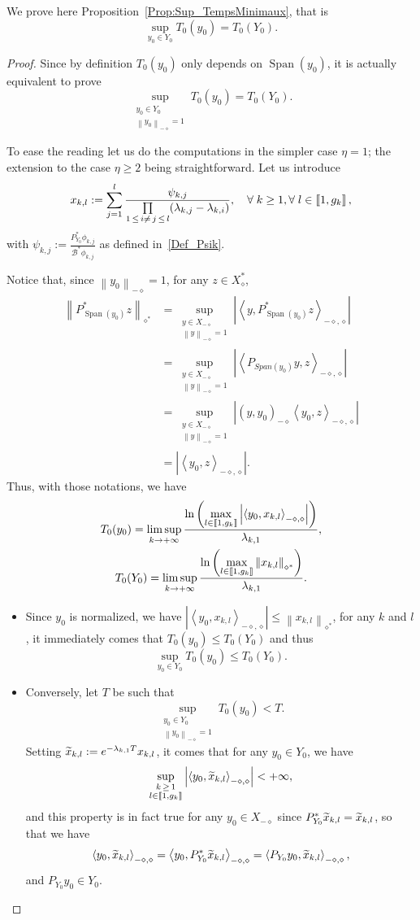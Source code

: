 \documentclass[10pt]{amsart}
\theoremstyle{definition}\newtheorem{defi}[theo]{Definition}\newtheorem{rema}[theo]{Remark}\newtheorem{exam}[theo]{Example}\newtheorem{exem}[theo]{Example}\newtheorem{nota}[theo]{Notation}
\newcommand{\llbracket}{\mathopen{[\mkern -2.7mu[}}
\newcommand{\rrbracket}{\mathclose{]\mkern -2.7mu]}}
\newcommand{\inter}[2]{\llbracket #1,#2 \rrbracket}
\newcommand\Bs{\mathcal{B}^*}
\newcommand{\Xalphas}{X_\diamond^*}
\newcommand{\Xmalpha}{X_{-\diamond}}
\newcommand{\Fzp}{Y_0}
\newcommand{\normeXalphas}[1]{\left\| #1 \right\|_{\diamond^*}}
\newcommand{\normeXmalpha}[1]{\left\| #1 \right\|_{-\diamond}}
\newcommand{\psXmalpha}[2]{\left(#1, #2 \right)_{-\diamond}}
\newcommand{\dual}[2]{\left\langle #1, #2 \right\rangle_{-\diamond,\diamond}}
\newcommand{\PF}{P_{\Fzp}}
\newcommand{\PFa}{P_{\Fzp}^*}
\newcommand{\n}{g}
\DeclareMathOperator{\Span}{Span}
\let\oldtilde\tilde
\renewcommand*{\tilde}[1]{\mathchoice{\widetilde{#1}}{\widetilde{#1}}{\oldtilde{#1}}{\oldtilde{#1}}}\let\oldexists\exists
\renewcommand*{\exists}{\mathrel{\oldexists}}
\let\oldforall\forall
\renewcommand*{\forall}{\mathrel{\oldforall}}
\begin{document}
We prove here Proposition~\ref{Prop:Sup_TempsMinimaux}, that is
\[
\sup_{y_0\in \Fzp} T_{0}(y_0) = T_{0}(\Fzp).
\]
\begin{proof}
Since by definition $T_0(y_0)$ only depends on $\Span(y_0)$, it is actually equivalent to prove
\[
\sup_{\substack{y_0\in \Fzp \\ \normeXmalpha{y_0}=1}} T_{0}(y_0) = T_{0}(\Fzp).
\]

To ease the reading let us do the computations in the simpler case $\eta=1$; the extension to the case $\eta \geq 2$ being straightforward. Let us introduce
\[
x_{k,l} := \sum\limits_{j=1}^l \frac{\psi_{k,j} }{\prod\limits_{1\,\leq\,i \neq\,j\,\leq\,l} (\lambda_{k,j}-\lambda_{k,i})},\quad \forall k\geq 1, \forall l\in \inter{1}{\n_k}\,,
\]
with $\psi_{k,j} := \frac{\PFa \phi_{k,j}}{\Bs \phi_{k,j}}$ as defined in~\eqref{Def_Psik}.



Notice that, since $\normeXmalpha{y_0} =1$, for any $z \in \Xalphas$,
\begin{align*}
\normeXalphas{ P_{\Span(y_0)}^* z } &= \sup\limits_{ \substack{ y \in \Xmalpha \\ \normeXmalpha{y}=1 } } \left| \dual{y}{P_{\Span(y_0)}^*z} \right|
\\
&= \sup\limits_{ \substack{ y \in \Xmalpha \\ \normeXmalpha{y}=1 } } \left| \dual{P_{Span(y_0)}y}{z} \right|
\\
&= \sup\limits_{ \substack{ y \in \Xmalpha \\ \normeXmalpha{y}=1 } } \left| \psXmalpha{y}{y_0} \dual{y_0}{z} \right|
\\
&= \left| \dual{y_0}{z} \right|.
\end{align*}
Thus, with those notations, we have
\begin{gather*}
T_0(y_0) = \limsup_{k\to+\infty} \frac{\ln \left(\max\limits_{l\in \inter{1}{\n_k}} \left| \dual{y_0}{x_{k,l}} \right| \right)}{\lambda_{k,1}},
\\
T_0(\Fzp) = \limsup_{k\to+\infty} \frac{\ln \left(\max\limits_{l\in \inter{1}{\n_k}} \normeXalphas{x_{k,l}} \right)}{\lambda_{k,1}}.
\end{gather*}
\begin{itemize}
\item Since $y_0$ is normalized, we have $\left|\dual{y_0}{x_{k,l}} \right| \leq \normeXalphas{x_{k,l}}$, for any $k$ and $l$, it immediately comes that $T_0(y_0)\leq T_0(\Fzp)$ and thus
\[
\sup_{y_0 \in \Fzp} T_0(y_0) \leq T_0(\Fzp).
\]
\item Conversely, let $T$ be such that
\[
\sup_{\substack{y_0\in \Fzp \\ \normeXmalpha{y_0}=1}} T_0(y_0) < T.
\]
Setting $\tilde{x}_{k,l} := e^{-\lambda_{k,1} T} x_{k,l}$, it comes that for any $y_0 \in \Fzp$, we have
\[
\sup_{\substack{k\,\geq\,1 \\ l\in \inter{1}{\n_k}}} \left| \dual{y_0}{\tilde{x}_{k,l}} \right| < + \infty,
\]
and this property is in fact true for any $y_0\in \Xmalpha$ since $\PFa \tilde{x}_{k,l} = \tilde{x}_{k,l}$, so that we have
\[
\dual{y_0}{\tilde{x}_{k,l}} = \dual{y_0}{\PFa \tilde{x}_{k,l}} = \dual{\PF y_0}{ \tilde{x}_{k,l}},
\]
and $\PF y_0\in \Fzp$.


\end{itemize}
\end{proof}
\end{document}
